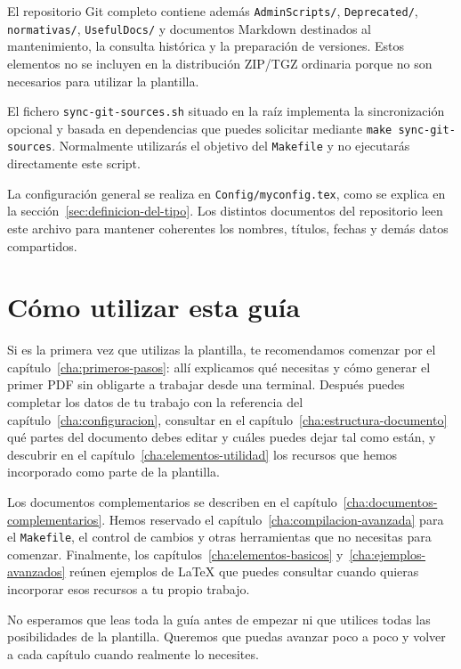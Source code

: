 El repositorio Git completo contiene además \texttt{AdminScripts/}, \texttt{Deprecated/}, \texttt{normativas/}, \texttt{UsefulDocs/} y documentos Markdown destinados al mantenimiento, la consulta histórica y la preparación de versiones. Estos elementos no se incluyen en la distribución ZIP/TGZ ordinaria porque no son necesarios para utilizar la plantilla.

El fichero \texttt{sync-git-sources.sh} situado en la raíz implementa la sincronización opcional y basada en dependencias que puedes solicitar mediante \texttt{make sync-git-sources}. Normalmente utilizarás el objetivo del \texttt{Makefile} y no ejecutarás directamente este script.

La configuración general se realiza en \texttt{Config/myconfig.tex}, como se explica en la sección~\ref{sec:definicion-del-tipo}. Los distintos documentos del repositorio leen este archivo para mantener coherentes los nombres, títulos, fechas y demás datos compartidos.



\section{Cómo utilizar esta guía}
\label{sec:itinerario-guia}

Si es la primera vez que utilizas la plantilla, te recomendamos comenzar por el capítulo~\ref{cha:primeros-pasos}: allí explicamos qué necesitas y cómo generar el primer PDF sin obligarte a trabajar desde una terminal. Después puedes completar los datos de tu trabajo con la referencia del capítulo~\ref{cha:configuracion}, consultar en el capítulo~\ref{cha:estructura-documento} qué partes del documento debes editar y cuáles puedes dejar tal como están, y descubrir en el capítulo~\ref{cha:elementos-utilidad} los recursos que hemos incorporado como parte de la plantilla.

Los documentos complementarios se describen en el capítulo~\ref{cha:documentos-complementarios}. Hemos reservado el capítulo~\ref{cha:compilacion-avanzada} para el \texttt{Makefile}, el control de cambios y otras herramientas que no necesitas para comenzar. Finalmente, los capítulos~\ref{cha:elementos-basicos} y~\ref{cha:ejemplos-avanzados} reúnen ejemplos de \LaTeX{} que puedes consultar cuando quieras incorporar esos recursos a tu propio trabajo.

No esperamos que leas toda la guía antes de empezar ni que utilices todas las posibilidades de la plantilla. Queremos que puedas avanzar poco a poco y volver a cada capítulo cuando realmente lo necesites.









